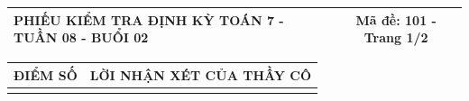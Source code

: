 \documentclass[12pt,a4paper]{article}
\begin{document}
\pagestyle{empty}

\noindent
\begin{tabularx}{\linewidth}{|X|c|}
\hline
\textbf{PHIẾU KIỂM TRA ĐỊNH KỲ TOÁN 7 - TUẦN 08 - BUỔI 02} & \textbf{Mã đề: 101 - Trang 1/2} \\
\hline
\end{tabularx}

\vspace{1.2mm}

\noindent
\begin{tabularx}{\linewidth}{|p{3.2cm}|X|}
\hline
\centering\textbf{ĐIỂM SỐ} & \centering\textbf{LỜI NHẬN XÉT CỦA THẦY CÔ} \tabularnewline
\hline
\rule{0pt}{1.8cm} & \tabularnewline
\hline
\end{tabularx}

\vspace{1.5mm}
\end{document}
